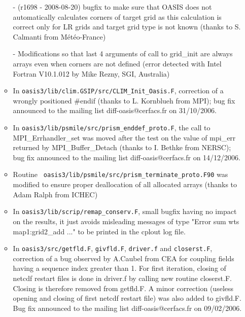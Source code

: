 \begin{itemize}
\begin{itemize}
    - (r1698 - 2008-08-20) bugfix to
    make sure that OASIS does not automatically calculates corners of
    target grid as this calculation is correct only for LR grids and target
    grid type is not known (thanks to S. Calmanti from
    M\'et\'eo-France)
    
    - Modifications so that last 4 arguments of call to grid\_init are 
    always arrays even when corners are not defined (error detected with 
    Intel Fortran V10.1.012 by Mike Rezny, SGI, Australia)

  \item In {\tt oasis3/lib/clim.GSIP/src/CLIM\_Init\_Oasis.F},
    correction of a wrongly positioned \#endif (thanks to L. Kornblueh
    from MPI); bug fix announced to the mailing list
    diff-oasis@cerfacs.fr on 31/10/2006.

  \item In {\tt oasis3/lib/psmile/src/prism\_enddef\_proto.F}, the
    call to MPI\_Errhandler\_set was moved after the test on the value
    of mpi\_err returned by MPI\_Buffer\_Detach (thanks to I. Bethke
    from NERSC); bug
    fix announced to the mailing list diff-oasis@cerfacs.fr on
    14/12/2006.

  \item Routine {\tt
      oasis3/lib/psmile/src/prism\_terminate\_proto.F90} was modified
    to ensure proper deallocation of all allocated arrays (thanks to
    Adam Ralph from ICHEC)
  

  \item In {\tt oasis3/lib/scrip/remap\_conserv.F}, small bugfix
    having no impact on the results, it just avoids misleading
    messages of type "Error sum wts map1:grid2\_add ..."  to be printed
    in the cplout log file.

  \item In {\tt oasis3/src/getfld.F}, {\tt givfld.F},
    {\tt driver.f} and {\tt closerst.F}, correction of a bug observed
    by A.Caubel from CEA for coupling fields having a sequence index
    greater than 1. For first iteration, closing of netcdf restart
    files is done in driver.f by calling new routine closerst.F.
    Closing is therefore removed from getfld.F.  A minor correction
    (useless opening and closing of first netcdf restart file) was
    also added to givfld.F. Bug
    fix announced to the mailing list diff-oasis@cerfacs.fr on
    09/02/2006.


\end{itemize}
\end{itemize}
